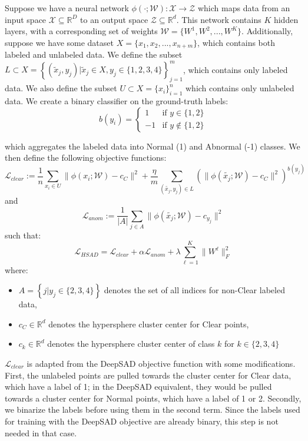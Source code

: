 \documentclass{article}
\begin{document}
Suppose we have a neural network $\phi(\cdot;\mathcal{W}): \mathcal{X} \rightarrow \mathcal{Z}$ which maps data from an input space $\mathcal{X} \subseteq \mathbb{R}^D$ to an output space $\mathcal{Z} \subseteq \mathbb{R}^d$. This network contains $K$ hidden layers, with a corresponding set of weights $\mathcal{W} = \{W^1, W^2, ..., W^K\}$. Additionally, suppose we have some dataset $X = \{x_1, x_2, ..., x_{n+m}\}$, which contains both labeled and unlabeled data. We define the subset $L \subset X = \left\{(\tilde{x}_j, y_j) | \tilde{x}_j \in X, y_j \in \{1, 2,3, 4\}\right\}_{j=1}^{m}$, which contains only labeled data. We also define the subset $U \subset X = \{x_i\}_{i=1}^{n}$ which contains only unlabeled data. We create a binary classifier on the ground-truth labels:
\[b(y_i) = \begin{cases}
    1 & \text{if } y \in \{1,2\} \\
    -1 & \text{if } y \notin \{1,2\}
\end{cases}\]

which aggregates the labeled data into Normal (1) and Abnormal (-1) classes. We then define the following objective functions:
\[\mathcal{L}_{clear} := \frac{1}{n}\sum_{x_i \in U}{\|\phi(x_i;\mathcal{W}) - c_C\|^2} + \frac{\eta}{m}\sum_{(\tilde{x_j}, y_j) \in L}{(\|\phi(\tilde{x_j};\mathcal{W}) - c_C\|^{2})^{b(y_j)}}\]
and
\[\mathcal{L}_{anom} := \frac{1}{|A|}\sum_{j \in A}{\|\phi(\tilde{x_j};\mathcal{W}) - c_{y_j}\|^2}\]
such that:
\[\mathcal{L}_{HSAD} = \mathcal{L}_{clear} + \alpha\mathcal{L}_{anom} + \lambda\sum_{\ell = 1}^{K}{\|W^{\ell}\|^2_F}\]
where:
\begin{itemize}
\item $A = \left\{j | y_j \in \{2,3,4\}\right\}$ denotes the set of all indices for non-Clear labeled data,
\item $c_C \in \mathbb{R}^d$ denotes the hypersphere cluster center for Clear points,
\item $c_k \in \mathbb{R}^d$ denotes the hypersphere cluster center of class $k$ for $k \in \{2,3,4\}$
\end{itemize}

$\mathcal{L}_{clear}$ is adapted from the \ac{DeepSAD} objective function with some modifications. First, the unlabeled points are pulled towards the cluster center for Clear data, which have a label of 1; in the \ac{DeepSAD} equivalent, they would be pulled towards a cluster center for Normal points, which have a label of 1 or 2. Secondly, we binarize the labels before using them in the second term. Since the labels used for training with the \ac{DeepSAD} objective are already binary, this step is not needed in that case. 
\end{document}
